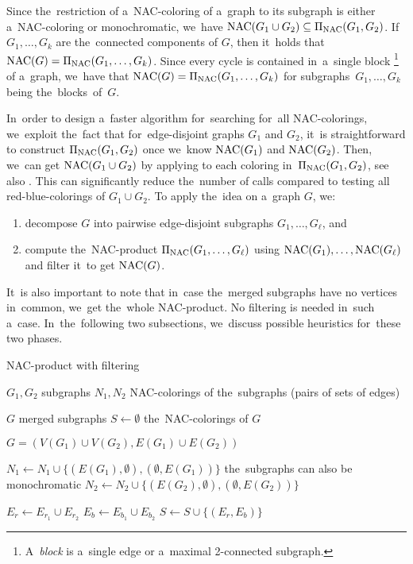 Since the~restriction of a~NAC-coloring of a~graph
to its subgraph is either a~NAC-coloring or monochromatic,
we~have $\operatorname{NAC}(G_{1} \cup G_{2}) \subseteq \operatorname{\Pi_{\operatorname{NAC}}}(G_{1}, G_{2})$.
If~$G_1, \dots, G_k$ are the~connected components of $G$,
then it~holds that $\operatorname{NAC}(G) = \operatorname{\Pi_{\operatorname{NAC}}}(G_1,\ldots, G_k)$.
Since every cycle is contained in~a~single
block%
\footnote{
	A~\emph{block} is a~single edge or a~maximal 2-connected subgraph.
}
of a~graph, we~have that $\operatorname{NAC}(G) = \operatorname{\Pi_{\operatorname{NAC}}}(G_1,\ldots, G_k)$
for subgraphs~$G_1,\ldots, G_k$ being the~blocks~of~$G$.

In~order to design a~faster algorithm for~searching for~all NAC-colorings,
we~exploit the~fact that for~edge-disjoint graphs $G_1$ and $G_2$,
it~is straightforward to construct $\operatorname{\Pi_{\operatorname{NAC}}}(G_{1}, G_{2})$ once we~know $\operatorname{NAC}(G_1)$ and $\operatorname{NAC}(G_2)$.
Then, we~can get $\operatorname{NAC}(G_{1} \cup G_{2})$ by applying \IsNACColoring{}
to each coloring in~$\operatorname{\Pi_{\operatorname{NAC}}}(G_{1}, G_{2})$, see also .
This can significantly reduce the~number of \IsNACColoring{} calls
compared to testing all red-blue-colorings of $G_{1} \cup G_{2}$.
To apply the~idea on a~graph $G$, we:
%
\begin{enumerate}
	\item decompose $G$ into pairwise edge-disjoint subgraphs $G_1, \ldots, G_\ell$, and
	\item compute the~NAC-product $\operatorname{\Pi_{\operatorname{NAC}}}(G_1, \dots, G_\ell)$ using $\operatorname{NAC}(G_1), \ldots, \operatorname{NAC}(G_\ell)$
	      and filter it~to get $\operatorname{NAC}(G)$.
\end{enumerate}
%
It~is also important to note that in~case the~merged subgraphs
have no vertices in~common, we~get the~whole NAC-product.
No filtering is needed in~such a~case.
%
In~the~following two subsections, we~discuss possible heuristics
for~these two phases.

\begin{algorithm}
	\caption{NAC-product with filtering}%
	\label{alg:coloring_product}
	\begin{algorithmic}[1]
		\Require{} $G_1, G_2$
		\Comment{} subgraphs
		\Require{} $N_1, N_2$
		\Comment{} NAC-colorings of the~subgraphs (pairs of sets of edges)

		\Ensure{} $G$
		\Comment{} merged subgraphs
		\Ensure{} $S \gets \emptyset$
		\Comment{} the~NAC-colorings of $G$

		\State{} $G = (V(G_1)\cup V(G_2), E(G_1) \cup E(G_2))$

		\State{} $N_1 \gets N_1 \cup \{(E(G_1), \emptyset), (\emptyset, E(G_1))\}$
		\Comment{} the~subgraphs can also be monochromatic
		\State{} $N_2 \gets N_2 \cup \{(E(G_2), \emptyset), (\emptyset, E(G_2))\}$

		\State{} $E_r \gets E_{r_{1}} \cup E_{r_{2}}$
		\State{} $E_b \gets E_{b_{1}} \cup E_{b_{2}}$
		\State{} $S \gets S \cup \{(E_r, E_b)\}$
		\EndIf{}
		\EndFor{}
		\EndFor{}
	\end{algorithmic}
\end{algorithm}

